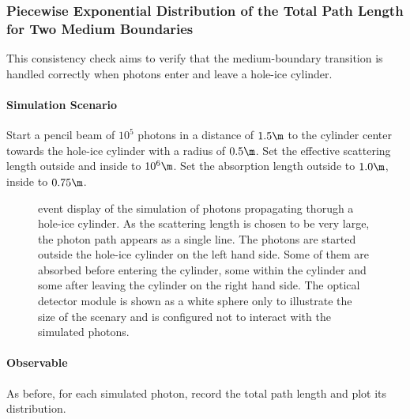 

\subsubsection{Piecewise Exponential Distribution of the Total Path Length for Two Medium Boundaries}


This consistency check aims to verify that the medium-boundary transition is handled correctly when photons enter and leave a hole-ice cylinder.

\paragraph{Simulation Scenario} Start a pencil beam of $10^5$ photons in a distance of $1.5\m$ to the cylinder center towards the hole-ice cylinder with a radius of $0.5\m$. Set the effective scattering length outside and inside to $10^6\m$. Set the absorption length outside to $1.0\m$, inside to $0.75\m$.


\begin{figure}
  \caption{ event display of the simulation of photons propagating thorugh a hole-ice cylinder. As the scattering length is chosen to be very large, the photon path appears as a single line.  The photons are started outside the hole-ice cylinder on the left hand side. Some of them are absorbed before entering the cylinder, some within the cylinder and some after leaving the cylinder on the right hand side. The optical detector module is shown as a white sphere only to illustrate the size of the scenary and is configured not to interact with the simulated photons.}
\end{figure}

\paragraph{Observable} As before, for each simulated photon, record the total path length and plot its distribution.

